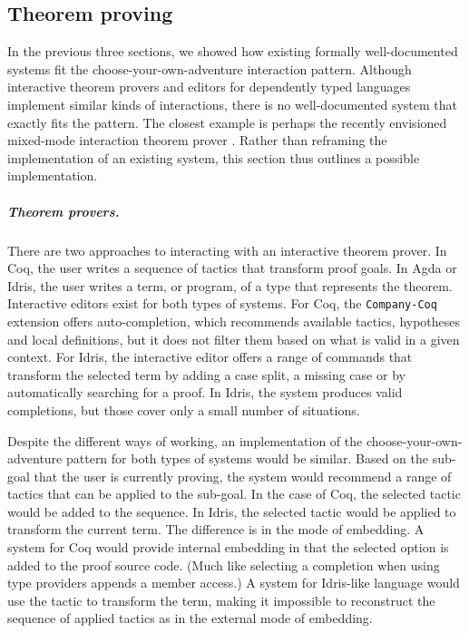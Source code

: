 \documentclass[a4paper,UKenglish,cleveref, autoref, thm-restate]{lipics-v2021}
\begin{document}
\newpage

\subsection{Theorem proving}

In the previous three sections, we showed how existing formally well-documented systems fit the
choose-your-own-adventure interaction pattern. Although interactive theorem provers and editors
for dependently typed languages implement similar kinds of interactions, there is no well-documented
system that exactly fits the pattern. The closest example is perhaps the recently envisioned
mixed-mode interaction theorem prover \cite{verter-2024-mixed}. Rather than reframing the
implementation of an existing system, this section thus outlines a possible implementation.

\subparagraph{Theorem provers.}
There are two approaches to interacting with an interactive theorem prover. In Coq, the user
writes a sequence of tactics that transform proof goals. In Agda or Idris, the user writes a
term, or program, of a type that represents the theorem. Interactive editors exist for both
types of systems. For Coq, the \texttt{Company-Coq} \cite{pitclaudel-2016-companycoq,aspinall-2000-general}
extension offers auto-completion, which recommends available tactics, hypotheses and local
definitions, but it does not filter them based on what is valid in a given context.
For Idris, the interactive editor \cite{brady-2015-idris} offers a range of commands that
transform the selected term by adding a case split, a missing case or by automatically searching
for a proof. In Idris, the system produces valid completions, but those cover only a small number
of situations.

Despite the different ways of working, an implementation of the choose-your-own-adventure
pattern for both types of systems would be similar. Based on the sub-goal that the user is
currently proving, the system would recommend a range of tactics that can be applied to the
sub-goal. In the case of Coq, the selected tactic would be added to the sequence. In Idris, the
selected tactic would be applied to transform the current term. The difference is in the mode of
embedding. A system for Coq would provide internal embedding in that the selected option is added
to the proof source code. (Much like selecting a completion when using type providers appends a
member access.) A system for Idris-like language would use the tactic to transform the term,
making it impossible to reconstruct the sequence of applied tactics as in the external mode of
embedding.
\end{document}
